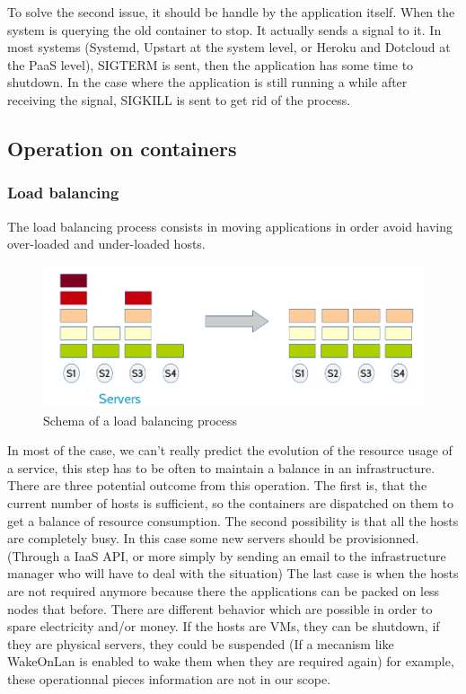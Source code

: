 To solve the second issue, it should be handle by the application itself. When
the system is querying the old container to stop. It actually sends a signal to
it.  In most systems (Systemd, Upstart at the system level, or Heroku and
Dotcloud at the PaaS level), SIGTERM is sent, then the application has some
time to shutdown. In the case where the application is still running a while
after receiving the signal, SIGKILL is sent to get rid of the process.

\subsection{Operation on containers}

\subsubsection{Load balancing}

The load balancing process consists in moving applications in order avoid having
over-loaded and under-loaded hosts.

\begin{figure}[h!]
	\includegraphics[width=\textwidth]{./Images/loadbalancing.png}
	\caption{Schema of a load balancing process}
\end{figure}

In most of the case, we can't really predict the evolution of the resource usage
of a service, this step has to be often to maintain a balance in an
infrastructure.  There are three potential outcome from this operation. The
first is, that the current number of hosts is sufficient, so the containers are
dispatched on them to get a balance of resource consumption. The second
possibility is that all the hosts are completely busy. In this case some new
servers should be provisionned. (Through a IaaS API, or more simply by sending
an email to the infrastructure manager who will have to deal with the
situation) The last case is when the hosts are not required anymore because
there the applications can be packed on less nodes that before. There are
different behavior which are possible in order to spare electricity and/or
money. If the hosts are VMs, they can be shutdown, if they are physical
servers, they could be suspended (If a mecanism like WakeOnLan is enabled to
wake them when they are required again) for example, these operationnal pieces
information are not in our scope.

